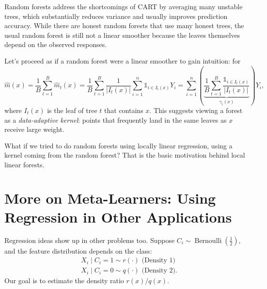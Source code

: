 Random forests address the shortcomings of CART by averaging many unstable trees, which substantially reduces variance and usually improves prediction accuracy. While there are honest random forests that use many honest trees, the usual random forest is still not a linear smoother because the leaves themselves depend on the observed responses.

Let's proceed as if a random forest were a linear smoother to gain intuition: for \[
	\hat{m}(x) = \frac{1}{B} \sum\limits_{t=1}^{B} \hat{m}_t (x) = \frac{1}{B} \sum\limits_{t=1}^{B} \frac{1}{\left| I_t(x) \right|} \sum\limits_{i=1}^{n} \mathds{1}_{i \in I_t(x)}Y_i = \sum\limits_{i=1}^{n} \left(\underbrace{ \frac{1}{B }\sum\limits_{t=1}^{B} \frac{\mathds{1}_{i \in I_t(x)}}{\left| I_t(x) \right|} }_{\gamma_i(x)}\right)Y_i
, \] where $I_t(x)$ is the leaf of tree $t$ that contains $x$. This suggests viewing a forest as a \emph{data-adaptive kernel}: points that frequently land in the same leaves as $x$ receive large weight.

What if we tried to do random forests using locally linear regression, using a kernel coming from the random forest? That is the basic motivation behind local linear forests.

\section{More on Meta-Learners: Using Regression in Other Applications}
Regression ideas show up in other problems too. Suppose $C_i \sim \operatorname{Bernoulli}(\frac{1}{2})$, and the feature distribution depends on the class:
\begin{align*}
	&X_i \mid C_i = 1 \sim r(\cdot ) \text{ (Density 1)} \\
	&X_i \mid C_i = 0 \sim q(\cdot ) \text{ (Density 2)}
.\end{align*}
Our goal is to estimate the density ratio $r(x) / q(x)$.

